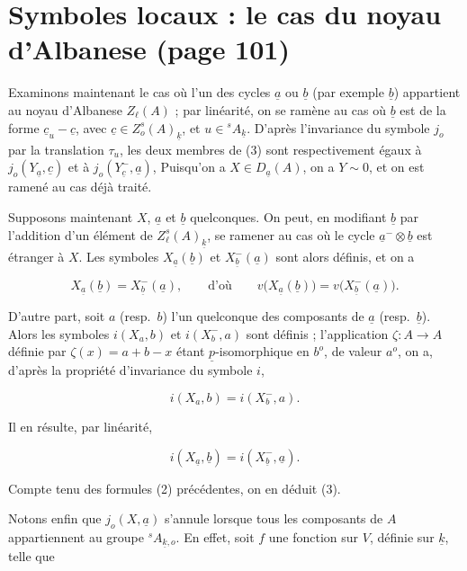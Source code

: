 \documentclass[11pt,a4paper]{article}
\begin{document}
\section*{Symboles locaux : le cas du noyau d'Albanese (page 101)}


Examinons maintenant le cas où l'un des cycles $\underline{a}$ ou
$\underline{b}$ (par exemple $\underline{b}$) appartient au noyau d'Albanese
$Z_{\ell}(A)$ ; par linéarité, on se ramène au cas où $\underline{b}$ est de la
forme $\underline{c}_{u} - \underline{c}$, avec $\underline{c} \in
Z_{o}^{s}(A)_{\underline{k}}$, et $u \in {}^{s}\!A_{\underline{k}}$. D'après
l'invariance du symbole $j_{o}$ par la translation $\tau_{u}$, les deux membres
de (3) sont respectivement égaux à $j_{o}(Y_{\underline{a}}, \underline{c})$ et
à $j_{o}(Y^{-}_{\underline{c}}, \underline{a})$,  Puisqu'on a $X \in D_{\underline{a}}(A)$, on a $Y \sim 0$, et on est ramené
au cas déjà traité.

Supposons maintenant $X$, $\underline{a}$ et $\underline{b}$ quelconques. On
peut, en modifiant $\underline{b}$ par l'addition d'un élément de
$Z_{\ell}^{s}(A)_{\underline{k}}$, se ramener au cas où le cycle $\underline{a}^{-}
\otimes \underline{b}$ est étranger à $X$. Les symboles
$X_{\underline{a}}(\underline{b})$ et $X^{-}_{\underline{b}}(\underline{a})$
sont alors définis, et on a

\[ X_{\underline{a}}(\underline{b}) = X^{-}_{\underline{b}}(\underline{a}),
\qquad \text{d'où} \qquad v\big(X_{\underline{a}}(\underline{b})\big) =
v\big(X^{-}_{\underline{b}}(\underline{a})\big). \]

D'autre part, soit $a$ (resp.\ $b$) l'un quelconque des composants de
$\underline{a}$ (resp.\ $\underline{b}$). Alors les symboles $i(X_{a}, b)$ et
$i(X^{-}_{b}, a)$ sont définis ; l'application $\zeta : A \to A$ définie par
$\zeta(x) = a + b - x$ étant $\underline{p}$-isomorphique en $b^{o}$, de valeur
$a^{o}$, on a, d'après la propriété d'invariance du symbole $i$,

\[ i(X_{a}, b) = i(X^{-}_{b}, a). \]

Il en résulte, par linéarité,

\[ i(X_{\underline{a}}, \underline{b}) = i(X^{-}_{\underline{b}},
\underline{a}). \]

Compte tenu des formules (2) précédentes, on en déduit (3).

Notons enfin que $j_{o}(X, \underline{a})$ s'annule lorsque tous les composants
de $A$ appartiennent au groupe ${}^{s}\!A_{\underline{k}, o}$. En effet, soit
$f$ une fonction sur $V$, définie sur $\underline{k}$, telle que
\end{document}
